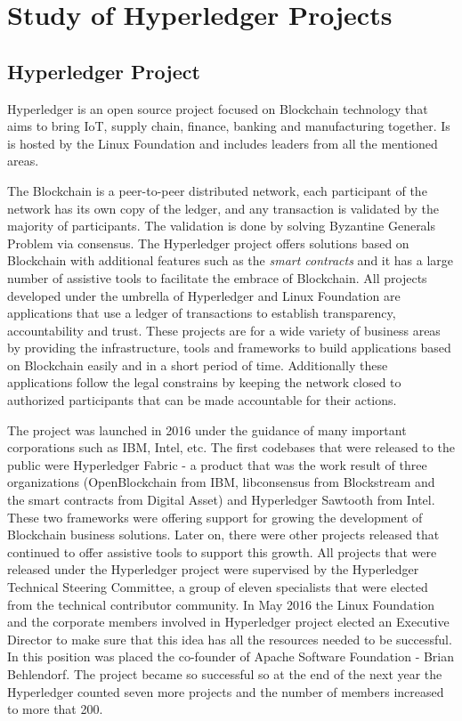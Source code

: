 \chapter{Study of Hyperledger Projects}
\label{chapter:chapter2}

\section{Hyperledger Project}
\label{sub-sec:chapter1-section1}
Hyperledger is an open source project focused on Blockchain technology that aims to bring IoT, supply chain, finance, banking and manufacturing together. Is is hosted by the Linux Foundation and includes leaders from all the mentioned areas.

The Blockchain is a peer-to-peer distributed network, each participant of the network has its own copy of the ledger, and any transaction is validated by the majority of participants. The validation is done by solving Byzantine Generals Problem via consensus.
The Hyperledger project offers solutions based on Blockchain with additional features such as the \emph{smart contracts} and it has a large number of assistive tools to facilitate the embrace of Blockchain.
All projects developed under the umbrella of Hyperledger and Linux Foundation are applications that use a ledger of transactions to establish transparency, accountability and trust. These projects are for a wide variety of business areas by providing the infrastructure, tools and frameworks to build applications based on Blockchain easily and in a short period of time. Additionally these applications follow the legal constrains by keeping the network closed to authorized participants that can be made accountable for their actions.

The project was launched in 2016 under the guidance of many important corporations such as IBM, Intel, etc. The first codebases that were released to the public were Hyperledger Fabric - a product that was the work result of three organizations (OpenBlockchain from IBM, libconsensus from Blockstream and the smart contracts from Digital Asset) and Hyperledger Sawtooth from Intel. 
These two frameworks were offering support for growing the development of Blockchain business solutions. Later on, there were other projects released that continued to offer assistive tools to support this growth. All projects that were released under the Hyperledger project were supervised by the Hyperledger Technical Steering Committee, a group of eleven specialists that were elected from the technical contributor community.
In May 2016 the Linux Foundation and the corporate members involved in Hyperledger project elected an Executive Director to make sure that this idea has all the resources needed to be successful. In this position was placed the co-founder of Apache Software Foundation - Brian Behlendorf. 
The project became so successful so at the end of the next year the Hyperledger counted seven more projects and the number of members increased to more that 200.

